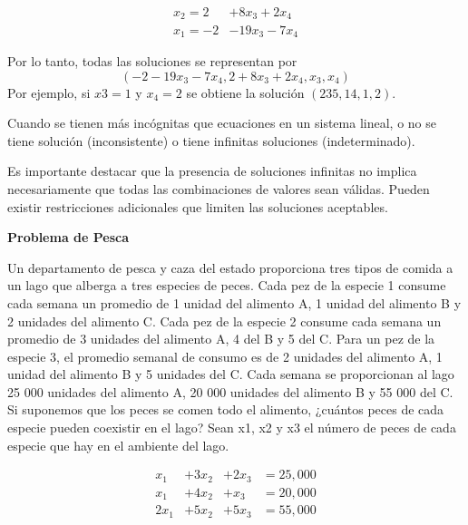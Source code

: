 \documentclass{article}
\begin{document}
\begin{equation*}
    \begin{aligned}
        x_2 = 2 & +8x_3 + 2x_4\\
        x_1 =-2 & -19x_3-7x_4 
    \end{aligned}
\end{equation*}

Por lo tanto, todas las soluciones se representan por $$(-2 -19x_3 -7x_4, 2 + 8x_3 + 2x_4, x_3, x_4)$$ Por ejemplo, si $x3 = 1$ y $x_4 = 2$ se obtiene la solución $(235, 14, 1, 2)$.

\begin{tcolorbox}[colback=green!20!white,colframe=green!80!black,title=Soluciones en un Sistema con más Incógnitas que Ecuaciones]
    Cuando se tienen más incógnitas que ecuaciones en un sistema lineal, o no se tiene solución (inconsistente) o tiene infinitas soluciones (indeterminado).

    Es importante destacar que la presencia de soluciones infinitas no implica necesariamente que todas las combinaciones de valores sean válidas. Pueden existir restricciones adicionales que limiten las soluciones aceptables.
\end{tcolorbox}

\begin{large}
    \textbf{Problema de Pesca}
\end{large}

Un departamento de pesca y caza del estado proporciona tres tipos de comida a un lago que alberga a tres especies de peces. Cada pez de la especie 1 consume cada semana un promedio de 1 unidad del alimento A, 1 unidad del alimento B y 2 unidades del alimento C. Cada pez de la especie 2 consume cada semana un promedio de 3 unidades del alimento A, 4 del B y 5 del C. Para un pez de la especie 3, el promedio semanal de consumo es de 2 unidades del alimento A, 1 unidad del alimento B y 5 unidades del C. Cada semana se proporcionan al lago 25 000 unidades del alimento A, 20 000 unidades del alimento B y 55 000 del C. Si suponemos que los peces se comen todo el alimento, ¿cuántos peces de cada especie pueden coexistir en el lago? Sean x1, x2 y x3 el número de peces de cada especie que hay en el ambiente del lago.

\begin{equation*}
    \begin{aligned}
        x_1 &+ 3x_2 &+ 2x_3 &= 25,000\\
        x_1 &+ 4x_2 &+ x_3 &= 20,000\\
        2x_1 &+ 5x_2 &+ 5x_3 &= 55,000
    \end{aligned}
\end{equation*}
\end{document}
